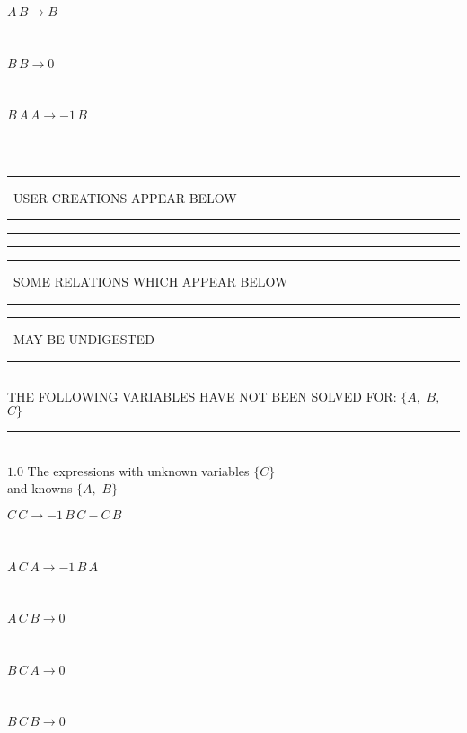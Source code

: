 \documentclass[rep10,leqno]{report}
\begin{document}
\begin{minipage}{6in}
$
A\,
 B\rightarrow B
$
\end{minipage}\medskip \\
\begin{minipage}{6in}
$
B\,
 B\rightarrow 0
$
\end{minipage}\medskip \\
\begin{minipage}{6in}
$
B\,
 A\,
 A\rightarrow -1\,
 B
$
\end{minipage}\\
\rule[2pt]{6in}{1pt}\hfil\break
\rule[2.5pt]{1.701in}{1pt}
\ USER CREATIONS APPEAR BELOW\ 
\rule[2.5pt]{1.701in}{1pt}\hfil\break
\rule[2pt]{6in}{1pt}\hfil\break
\rule[2pt]{6in}{4pt}\hfil\break
\rule[2pt]{1.45in}{4pt}
\ SOME RELATIONS WHICH APPEAR BELOW\ 
\rule[2pt]{1.45in}{4pt}\hfil\break
\rule[2pt]{2.18in}{4pt}
\ MAY BE UNDIGESTED\ 
\rule[2pt]{2.18in}{4pt}\hfil\break
\rule[2pt]{6in}{4pt}\hfil\break
THE FOLLOWING VARIABLES HAVE NOT BEEN SOLVED FOR:\hfil\break
$\{A,
$ $
B,
$ $
C\}$
\smallskip\\
\rule[3pt]{6in}{.7pt}\\
$1.0$  The expressions with unknown variables $\{C\}$\\
and knowns $\{A,
$ $
B\}$\smallskip\\
\begin{minipage}{6in}
$
C\,
 C\rightarrow -1\,
 B\,
 C - C\,
 B
$
\end{minipage}\medskip \\
\begin{minipage}{6in}
$
A\,
 C\,
 A\rightarrow -1\,
 B\,
 A
$
\end{minipage}\medskip \\
\begin{minipage}{6in}
$
A\,
 C\,
 B\rightarrow 0
$
\end{minipage}\medskip \\
\begin{minipage}{6in}
$
B\,
 C\,
 A\rightarrow 0
$
\end{minipage}\medskip \\
\begin{minipage}{6in}
$
B\,
 C\,
 B\rightarrow 0
$
\end{minipage}\\
\vspace{10pt}
\end{document}
